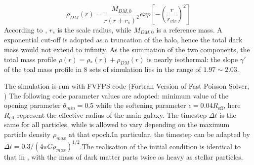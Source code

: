 \documentclass[fleqn,usenatbib]{mnras}
\begin{document}
\begin{equation}
    \label{eq:profile_halo}
    \rho_{DM}(r) = \frac{M_{DM,0}}{r(r+r_s)^2} exp\left[-\left(\frac{r}{r_{vir}}\right)^2\right]
\end{equation}
According to \cite{nipoti2009}, $r_s$ is the scale radius, while $M_{DM,0}$ is a reference mass. A exponential cut-off is adopted as a truncation of the halo, hence the total dark mass would not extend to infinity. As the summation of the two components, the total mass profile $\rho(r) = \rho_*(r) + \rho_{DM}(r)$ is nearly isothermal: the slope $\gamma'$ of the toal mass profile in 8 sets of simulation lies in the range of $1.97 \sim 2.03$.

\par The simulation is run with FVFPS code (Fortran Version of Fast Poisson Solver, \cite{londrillo03,nipoti03}) The following code parameter values are adopted: minimum value of the opening parameter $\theta_{min} = 0.5$ while the softening parameter $\epsilon = 0.04 R_\text{eff}$, here $R_\text{eff}$ represent the effective radius of the main galaxy. The timestep $\Delta t$ is the same for all particles, while is allowed to vary depending on the maximum particle density $\rho_{max}$ at that epoch.In particular, the timestep can be adapted by $\Delta t = 0.3/(4\pi G \rho_{max})^{1/2}$.The realisation of the initial condition is identical to that in \cite{nipoti2009}, with the mass of dark matter parts twice as heavy as stellar particles.
\end{document}
